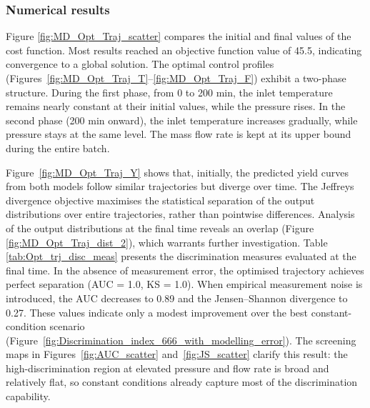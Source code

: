 \documentclass[../Article_Design_of_Experiment.tex]{subfiles}
\begin{document}
	\subsubsection{Numerical results}
	
	Figure \ref{fig:MD_Opt_Traj_scatter} compares the initial and final values of the cost function. Most results reached an objective function value of 45.5, indicating convergence to a global solution. The optimal control profiles (Figures~\ref{fig:MD_Opt_Traj_T}--\ref{fig:MD_Opt_Traj_F}) exhibit a two-phase structure. During the first phase, from 0 to 200 min, the inlet temperature remains nearly constant at their initial values, while the pressure rises. In the second phase (200 min onward), the inlet temperature increases gradually, while pressure stays at the same level. The mass flow rate is kept at its upper bound during the entire batch.
	
	Figure~\ref{fig:MD_Opt_Traj_Y} shows that, initially, the predicted yield curves from both models follow similar trajectories but diverge over time. The Jeffreys divergence objective maximises the statistical separation of the output distributions over entire trajectories, rather than pointwise differences. Analysis of the output distributions at the final time reveals an overlap (Figure \ref{fig:MD_Opt_Traj_dist_2}), which warrants further investigation. Table \ref{tab:Opt_trj_disc_meas} presents the discrimination measures evaluated at the final time. In the absence of measurement error, the optimised trajectory achieves perfect separation (AUC = 1.0, KS = 1.0). When empirical measurement noise is introduced, the AUC decreases to 0.89 and the Jensen--Shannon divergence to 0.27. These values indicate only a modest improvement over the best constant-condition scenario (Figure~\ref{fig:Discrimination_index_666_with_modelling_error}). The screening maps in Figures~\ref{fig:AUC_scatter} and~\ref{fig:JS_scatter} clarify this result: the high-discrimination region at elevated pressure and flow rate is broad and relatively flat, so constant conditions already capture most of the discrimination capability.
	
	\begin{table}[h!]
		\centering
		\caption{Single-point discrimination diagnostics of the optimal trajectory}
		\label{tab:Opt_trj_disc_meas}
	\end{table}
	
\end{document}
